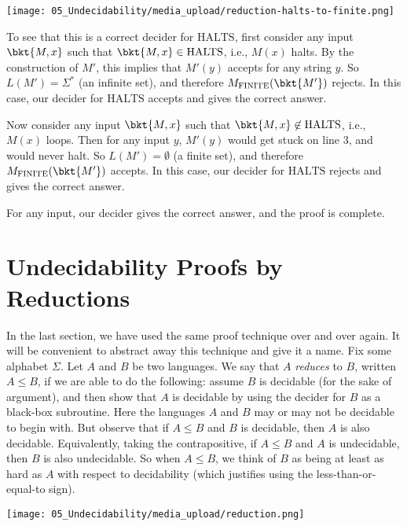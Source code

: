 \begin{flex}
\begin{solution}
\begin{center}
\texttt{[image: 05\_Undecidability/media\_upload/reduction-halts-to-finite.png]}
\end{center}

To see that this is a correct decider for $\text{HALTS}$, first consider any input $\bkt{M,x}$ such that $\bkt{M,x} \in \text{HALTS}$, i.e., $M(x)$ halts. By the construction of $M'$, this implies that $M'(y)$ accepts for any string $y$. So $L(M') = \Sigma^*$ (an infinite set), and therefore $M_\text{FINITE}(\bkt{M'})$ rejects. In this case, our decider for $\text{HALTS}$ accepts and gives the correct answer.

Now consider any input $\bkt{M,x}$ such that $\bkt{M,x} \not\in \text{HALTS}$, i.e., $M(x)$ loops. Then for any input $y$, $M'(y)$ would get stuck on line 3, and would never halt. So $L(M') = \emptyset$ (a finite set), and therefore $M_\text{FINITE}(\bkt{M'})$ accepts. In this case, our decider for $\text{HALTS}$ rejects and gives the correct answer.

For any input, our decider gives the correct answer, and the proof is complete.

\end{solution}
\end{flex}


\section{Undecidability Proofs by Reductions}
\label{sec:Undecidable-Languages::undecidability-proofs-by-reductions}

\begin{important}
\label{important:Undecidability-proofs-by-reduction}
In the last section, we have used the same proof technique over and over again. It will be convenient to abstract away this technique and give it a name. Fix some alphabet $\Sigma$. Let $A$ and $B$ be two languages. We say that $A$ \emph{reduces} to $B$, written $A \leq B$, if we are able to do the following: assume $B$ is decidable (for the sake of argument), and then show that $A$ is decidable by using the decider for $B$ as a black-box subroutine. Here the languages $A$ and $B$ may or may not be decidable to begin with. But observe that if $A \leq B$ and $B$ is decidable, then $A$ is also decidable. Equivalently, taking the contrapositive, if $A \leq B$ and $A$ is undecidable, then $B$ is also undecidable. So when $A \leq B$, we think of $B$ as being at least as hard as $A$ with respect to decidability (which justifies using the less-than-or-equal-to sign).
\begin{center}
\texttt{[image: 05\_Undecidability/media\_upload/reduction.png]}
\end{center}

\end{important}

